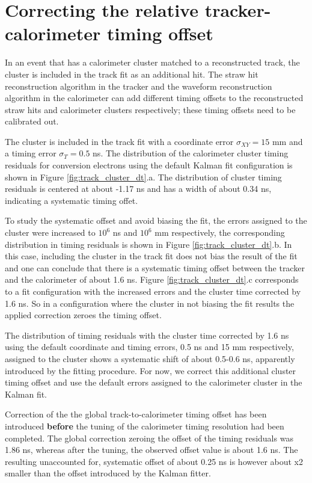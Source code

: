 \section{Correcting the relative tracker-calorimeter timing offset}

In an event that has a calorimeter cluster matched to a reconstructed track, the
cluster is included in the track fit as an additional hit. 
%
The straw hit reconstruction algorithm in the tracker and the waveform reconstruction 
algorithm in the calorimeter can add different timing offsets to the reconstructed straw hits
and calorimeter clusters respectively; these timing offsets need to be calibrated out.

The cluster is included in the track fit with a coordinate error $\sigma_{XY} = 15$ mm
and a timing error $\sigma_T = 0.5$ ns.
The distribution of the calorimeter cluster timing residuals for conversion electrons
using the default Kalman fit configuration is shown in Figure \ref{fig:track_cluster_dt}.a. 
The distribution of cluster timing residuals 
is centered at about -1.17 ns and has a width of about 0.34 ns, indicating a systematic timing offet.

To study the systematic offset and avoid biasing the fit, the errors assigned to the 
cluster were increased to $10^6$ ns and $10^6$ mm respectively,
the corresponding distribution in timing residuals is shown in Figure 
\ref{fig:track_cluster_dt}.b.
%
In this case, including the cluster in the track fit does not bias the result of the fit
and one can conclude that there is a systematic timing offset between the tracker
and the calorimeter of about 1.6 ns.
%
Figure \ref{fig:track_cluster_dt}.c corresponds to a fit configuration with
the increased errors and the cluster time corrected by 1.6 ns. So in a configuration
where the cluster in not biasing the fit results the applied correction zeroes
the timing offset.

The distribution of timing residuals with the cluster time corrected by 1.6 ns using
the default coordinate and timing errors, 0.5 ns and 15 mm respectively, 
assigned to the cluster shows a systematic shift of about 0.5-0.6 ns,
apparently introduced by the fitting procedure.
For now, we correct this additional cluster timing offset and use the default errors 
assigned to the calorimeter cluster in the Kalman fit.

Correction of the the global track-to-calorimeter timing offset  has been introduced {\bf before} 
the tuning of the calorimeter timing resolution had been completed.
The global correction zeroing the offset of the timing residuals was 1.86 ns,
whereas after the tuning, the observed offset value is about 1.6 ns.
The resulting unaccounted for, systematic offset of about 0.25 ns is however
about x2 smaller than the offset introduced by the Kalman fitter.

